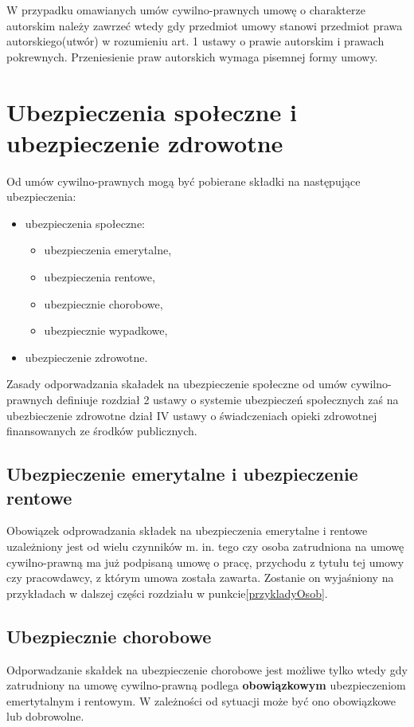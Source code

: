 W przypadku omawianych umów cywilno-prawnych umowę o charakterze autorskim należy zawrzeć wtedy gdy przedmiot umowy stanowi przedmiot prawa autorskiego(utwór) w rozumieniu art. 1 ustawy o prawie autorskim i prawach pokrewnych\cite{TODO}. Przeniesienie praw autorskich wymaga pisemnej formy umowy.

\section[Ubezpieczenia społeczne i ubezpieczenie zdrowotne][Ubezpieczenia społeczne i ubezpieczenie zdrowotne]{Ubezpieczenia społeczne i ubezpieczenie zdrowotne}
Od umów cywilno-prawnych mogą być pobierane składki na następujące ubezpieczenia:
\begin{itemize}
	\item ubezpieczenia społeczne:
	\begin{itemize}
		\item ubezpieczenia emerytalne,
		\item ubezpieczenia rentowe,
		\item ubezpiecznie chorobowe,
		\item ubezpiecznie wypadkowe,
	\end{itemize}
	\item ubezpieczenie zdrowotne.
\end{itemize}
Zasady odporwadzania skaładek na ubezpieczenie społeczne od umów cywilno-prawnych definiuje rozdział 2 ustawy o systemie ubezpieczeń społecznych\cite{TODO} zaś na ubezbieczenie zdrowotne dział IV ustawy o świadczeniach opieki zdrowotnej finansowanych ze środków publicznych\cite{TODO}.

\subsection[Ubezpieczenie emerytalne i ubezpieczenie rentowe][Ubezpieczenie emerytalne i ubezpieczenie rentowe]{Ubezpieczenie emerytalne i ubezpieczenie rentowe}
Obowiązek odprowadzania składek na ubezpieczenia emerytalne i rentowe uzależniony jest od wielu czynników m. in. tego czy osoba zatrudniona na umowę cywilno-prawną ma już podpisaną umowę o pracę, przychodu z tytułu tej umowy czy pracowdawcy, z którym umowa została zawarta. Zostanie on wyjaśniony na przykładach w dalszej części rozdziału w punkcie\ref{przykladyOsob}.

\subsection[Ubezpiecznie chorobowe][Ubezpiecznie chorobowe]{Ubezpiecznie chorobowe}
Odporwadzanie skałdek na ubezpieczenie chorobowe jest możliwe tylko wtedy gdy zatrudniony na umowę cywilno-prawną podlega \textbf{obowiązkowym} ubezpieczeniom emertytalnym i rentowym. W zależności od sytuacji może być ono obowiązkowe lub dobrowolne.

